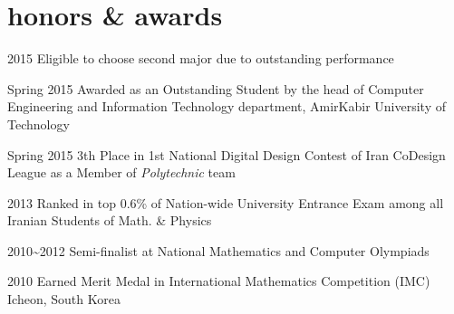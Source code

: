 \documentclass[]{friggeri-cv} %
\begin{document}

\section{honors \& awards}

\begin{entrylist}


\entry
{2015}
{{\normalfont Eligible to choose} \textcolor{TextGreen}{second major} {\normalfont due to outstanding performance}}
{}
{}


\entry
{Spring 2015}
{\normalfont Awarded as an Outstanding Student by the head of Computer Engineering and Information Technology department, AmirKabir University of Technology}
{}
{}


\entry
{Spring 2015}
{\textcolor{TextYellow}{3th} {\normalfont Place in 1st National Digital Design Contest of Iran CoDesign League as a Member of \emph{Polytechnic} team}}
{}
{}




\entry
{2013}
{\normalfont Ranked in top 0.6\% of Nation-wide University Entrance Exam among all Iranian Students of Math. \& Physics}
{}
{}


\entry
{2010\textasciitilde 2012}
{\textcolor{TextOrange}{Semi-finalist} {\normalfont at National Mathematics and Computer Olympiads}}
{}
{}


\entry
{2010}
{{\normalfont Earned} \textcolor{Ocean}{Merit Medal} {\normalfont in International Mathematics Competition (IMC) Icheon, South Korea}}
{}
{}

\end{entrylist}

\end{document}
